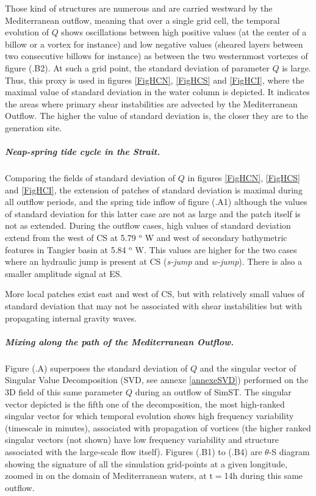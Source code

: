 Those kind of structures are numerous and are carried westward by the Mediterranean outflow, meaning that over a single grid cell, the temporal evolution of $Q$ shows oscillations between high positive values (at the center of a billow or a vortex for instance) and low negative values (sheared layers between two consecutive billows for instance) as between the two westernmost vortexes of figure (.B2). At such a grid point, the standard deviation of parameter $Q$ is large. Thus, this proxy is used in figures \ref{FigHCN}, \ref{FigHCS} and \ref{FigHCI}, where the maximal value of standard deviation in the water column is depicted. It indicates the areas where primary shear instabilities are advected by the Mediterranean Outflow. The higher the value of standard deviation is, the closer they are to the generation site.

\subparagraph{Neap-spring tide cycle in the Strait.}
Comparing the fields of standard deviation of $Q$ in figures \ref{FigHCN}, \ref{FigHCS} and \ref{FigHCI}, the extension of patches of standard deviation is maximal during all outflow periods, and the spring tide inflow of figure (.A1) although the values of standard deviation for this latter case are not as large and the patch itself is not as extended. During the outflow cases, high values of standard deviation extend from the west of CS at 5.79 $^\text{o}$ W and west of secondary bathymetric features in Tangier basin at 5.84 $^\text{o}$ W. This values are higher for the two cases where an hydraulic jump is present at CS (\textit{s-jump} and \textit{w-jump}). There is also a smaller amplitude signal at ES.

More local patches exist east and west of CS, but with relatively small values of standard deviation that may not be associated with shear instabilities but with propagating internal gravity waves.


\subparagraph{Mixing along the path of the Mediterranean Outflow.}
Figure (.A) superposes the standard deviation of $Q$ and the singular vector of Singular Value Decomposition (SVD, see annexe \ref{annexeSVD}) performed on the 3D field of this same parameter $Q$ during an outflow of SimST. The singular vector depicted is the fifth one of the decomposition, the most high-ranked singular vector for which temporal evolution shows high frequency variability (timescale in minutes), associated with propagation of vortices (the higher ranked singular vectors (not shown) have low frequency variability and structure associated with the large-scale flow itself). Figures (.B1) to (.B4) are $\theta$-S diagram showing the signature of all the simulation grid-points at a given longitude, zoomed in on the domain of Mediterranean waters, at t$=$14h during this same outflow.

